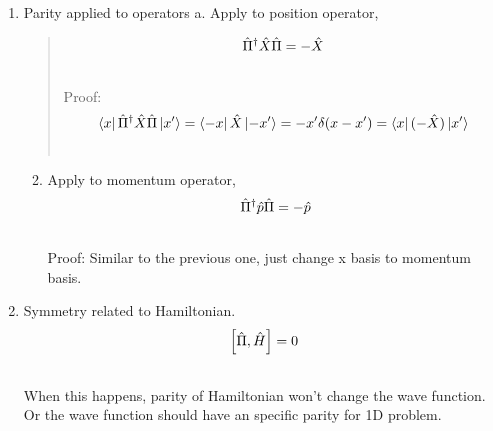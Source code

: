 \documentclass[letterpaper,10pt,english]{sphinxmanual}
\newcommand{\bra}[1]{\left\langle #1\right|}
\newcommand{\ket}[1]{\left| #1\right\rangle}
\begin{document}
\begin{enumerate}
\item {} 
Parity applied to operators
a. Apply to position operator,
\begin{quote}
\begin{gather}
\begin{split}\hat \Pi^\dagger \hat X \hat \Pi = -\hat X\end{split}\notag\\\begin{split}\end{split}\notag
\end{gather}
Proof:
\begin{gather}
\begin{split}\bra{x}\hat \Pi ^\dagger \hat X \hat \Pi \ket{x'} = \bra{-x}\hat X \ket{-x'}= -x'\delta(x-x') = \bra{x}(-\hat X)\ket{x'}\end{split}\notag\\\begin{split}\end{split}\notag
\end{gather}\end{quote}
\begin{enumerate}
\setcounter{enumi}{1}
\item {} 
Apply to momentum operator,
\begin{gather}
\begin{split}\hat \Pi^\dagger \hat p \hat \Pi = -\hat p\end{split}\notag\\\begin{split}\end{split}\notag
\end{gather}
Proof: Similar to the previous one, just change x basis to momentum basis.

\end{enumerate}

\item {} 
Symmetry related to Hamiltonian.
\begin{gather}
\begin{split}\left[ \hat \Pi , \hat H  \right] = 0\end{split}\notag\\\begin{split}\end{split}\notag
\end{gather}
When this happens, parity of Hamiltonian won't change the wave function. Or the wave function should have an specific parity for 1D problem.

\end{enumerate}
\end{document}
